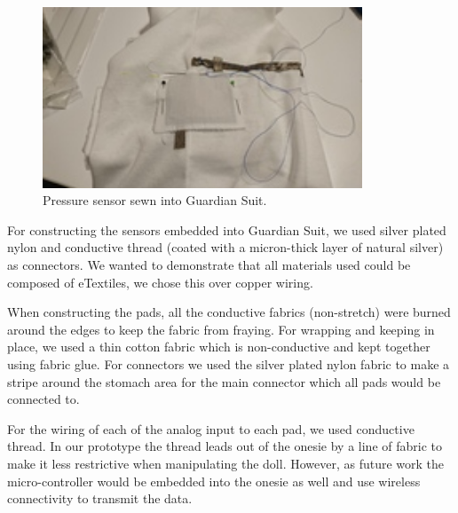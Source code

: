 \documentclass{sigchi-ext}
\begin{document}
{{\begin{minipage}{0.925\marginparwidth}
      \begin{figure} [H]
   \centering \includegraphics[width=0.85\textwidth]{img/resize/w200/pe_integration.JPG}
    \caption{Pressure sensor sewn into Guardian Suit.}
\end{figure}
    \end{minipage}}\label{sec:sidebar3} }

For constructing the sensors embedded into Guardian Suit, we used 
silver plated nylon and conductive thread (coated with a micron-thick layer of
natural silver) as connectors. We wanted to demonstrate that all materials used could be
composed of eTextiles, we chose this over copper wiring.

When constructing the pads, all the conductive fabrics (non-stretch) were
burned around the edges to keep the fabric from fraying.
For wrapping and keeping in place, we used a thin cotton
fabric which is non-conductive and kept together using
fabric glue.
For connectors we used the silver plated nylon fabric to make a stripe around
the stomach area for the main connector which all pads would be connected to.

For the wiring of each of the analog input to each pad, we used conductive
thread. In our prototype the thread leads out of the onesie by a line of
fabric to make it less restrictive when manipulating the doll. However, as future work the micro-controller would be embedded into
the onesie as well and use wireless connectivity to transmit the data.
\end{document}
